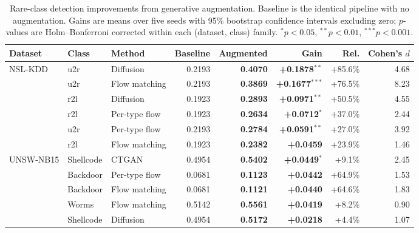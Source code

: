 \begin{table}[t]
\centering
\small
\setlength{\tabcolsep}{4pt}
\caption{Rare-class detection improvements from generative augmentation. Baseline is the identical pipeline with no augmentation. Gains are means over five seeds with 95\% bootstrap confidence intervals excluding zero; $p$-values are Holm--Bonferroni corrected within each (dataset, class) family. $^{*}p<0.05$, $^{**}p<0.01$, $^{***}p<0.001$.}
\label{tab:improvements}
\begin{tabular}{lllrrrrr}
\toprule
Dataset & Class & Method & Baseline & Augmented & Gain & Rel. & Cohen's $d$ \\
\midrule
NSL-KDD & u2r & Diffusion & 0.2193 & \textbf{0.4070} & \textbf{+0.1878}$^{**}$ & +85.6\% & 4.68 \\
 & u2r & Flow matching & 0.2193 & \textbf{0.3869} & \textbf{+0.1677}$^{***}$ & +76.5\% & 8.23 \\
 & r2l & Diffusion & 0.1923 & \textbf{0.2893} & \textbf{+0.0971}$^{**}$ & +50.5\% & 4.55 \\
 & r2l & Per-type flow & 0.1923 & \textbf{0.2634} & \textbf{+0.0712}$^{*}$ & +37.0\% & 2.44 \\
 & u2r & Per-type flow & 0.2193 & \textbf{0.2784} & \textbf{+0.0591}$^{**}$ & +27.0\% & 3.92 \\
 & r2l & Flow matching & 0.1923 & \textbf{0.2382} & \textbf{+0.0459} & +23.9\% & 1.46 \\
\midrule
UNSW-NB15 & Shellcode & CTGAN & 0.4954 & \textbf{0.5402} & \textbf{+0.0449}$^{*}$ & +9.1\% & 2.45 \\
 & Backdoor & Per-type flow & 0.0681 & \textbf{0.1123} & \textbf{+0.0442} & +64.9\% & 1.53 \\
 & Backdoor & Flow matching & 0.0681 & \textbf{0.1121} & \textbf{+0.0440} & +64.6\% & 1.83 \\
 & Worms & Flow matching & 0.5142 & \textbf{0.5561} & \textbf{+0.0419} & +8.2\% & 0.90 \\
 & Shellcode & Diffusion & 0.4954 & \textbf{0.5172} & \textbf{+0.0218} & +4.4\% & 1.07 \\
\bottomrule
\end{tabular}
\end{table}

